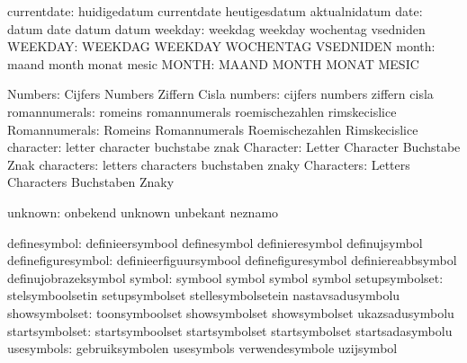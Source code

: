                   currentdate:  huidigedatum                 currentdate
                                heutigesdatum                aktualnidatum
                         date:  datum                        date
                                datum                        datum
                      weekday:  weekdag                      weekday
                                wochentag                    vsedniden
                      WEEKDAY:  WEEKDAG                      WEEKDAY
                                WOCHENTAG                    VSEDNIDEN
                        month:  maand                        month
                                monat                        mesic
                        MONTH:  MAAND                        MONTH
                                MONAT                        MESIC

                      Numbers:  Cijfers                      Numbers
                                Ziffern                      Cisla
                      numbers:  cijfers                      numbers
                                ziffern                      cisla
                romannumerals:  romeins                      romannumerals
                                roemischezahlen              rimskecislice
                Romannumerals:  Romeins                      Romannumerals
                                Roemischezahlen              Rimskecislice
                    character:  letter                       character
                                buchstabe                    znak
                    Character:  Letter                       Character
                                Buchstabe                    Znak
                   characters:  letters                      characters
                                buchstaben                   znaky
                   Characters:  Letters                      Characters
                                Buchstaben                   Znaky

                      unknown:  onbekend                     unknown
                                unbekant                     neznamo

                 definesymbol:  definieersymbool             definesymbol
                                definieresymbol              definujsymbol
           definefiguresymbol:  definieerfiguursymbool       definefiguresymbol
                                definiereabbsymbol           definujobrazeksymbol
                       symbol:  symbool                      symbol
                                symbol                       symbol
               setupsymbolset:  stelsymboolsetin             setupsymbolset
                                stellesymbolsetein           nastavsadusymbolu
                showsymbolset:  toonsymboolset               showsymbolset
                                showsymbolset                ukazsadusymbolu
               startsymbolset:  startsymboolset              startsymbolset
                                startsymbolset               startsadasymbolu
                   usesymbols:  gebruiksymbolen              usesymbols
                                verwendesymbole              uzijsymbol

